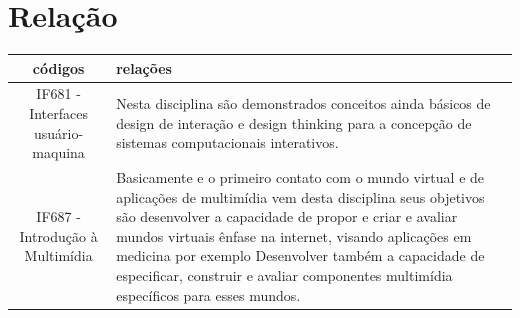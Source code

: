 \documentclass[10pt]{article}
\begin{document}
\section{Relação}

\begin{center}
\begin{tabular}{|c|p{6cm}|}
\hline
códigos & relações \\ \hline
 IF681 - Interfaces usuário-maquina &
 Nesta disciplina são demonstrados conceitos ainda básicos de design de interação e design thinking para a concepção de sistemas computacionais interativos.\cite{IF681}
 \\ \hline
  IF687 - Introdução à Multimídia  & 
Basicamente e o primeiro contato com o mundo virtual e de aplicações de multimídia vem desta disciplina seus objetivos são desenvolver a capacidade de propor e criar e avaliar mundos virtuais ênfase na internet, visando aplicações em medicina por exemplo
Desenvolver também a capacidade de especificar, construir e avaliar componentes multimídia específicos para esses mundos. \cite{IF687}
\\ \hline

\end{tabular}    
\end{center}



\end{document}
